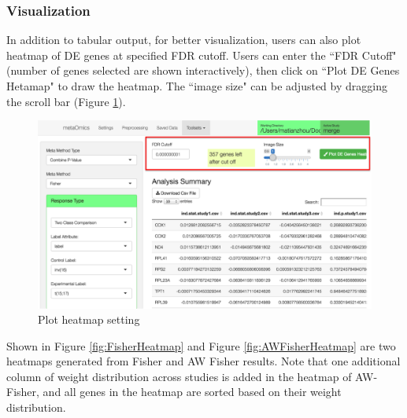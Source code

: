 \subsubsection{Visualization}

In addition to tabular output, for better visualization, users can also plot heatmap of DE genes at specified FDR cutoff. Users can enter the ``FDR Cutoff" (number of genes selected are shown interactively), then click on ``Plot DE Genes Hetamap" to draw the heatmap. The ``image size" can be adjusted by dragging the scroll bar (Figure \ref{fig:HeatmapSetting}).  

\begin{figure}[H]
\begin{center}
\includegraphics[scale=0.4]{./figure/metaDE/HeatmapSetting.png}
\caption{Plot heatmap setting}
\label{fig:HeatmapSetting}
\end{center}
\end{figure}

Shown in Figure \ref{fig:FisherHeatmap} and Figure \ref{fig:AWFisherHeatmap} are two heatmaps generated from Fisher and AW Fisher results. Note that one additional column of weight distribution across studies is added in the heatmap of AW-Fisher, and all genes in the heatmap are sorted based on their weight distribution.

